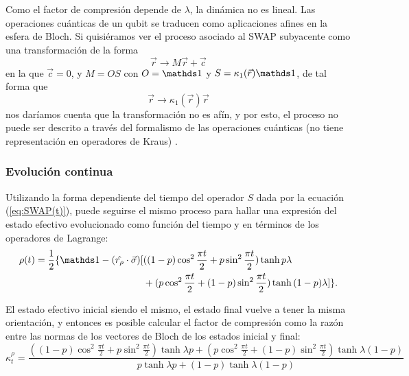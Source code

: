 Como el factor de compresión depende de $\lambda$, la dinámica no es lineal. Las operaciones cuánticas de un qubit se traducen como aplicaciones afines en la esfera de Bloch. Si quisiéramos ver el proceso asociado al \textsc{SWAP} subyacente como una transformación de la forma
\begin{equation*}
  \vec{r}\rightarrow M\vec{r}+\vec{c}
\end{equation*}
en la que $\vec{c}=0$, y $M=OS$ con $O=\Id$ y $S=\kappa_{1}(\vec{r})\Id$, de tal forma que
\begin{equation*}
  \vec{r}\rightarrow \kappa_{1}(\vec{r})\vec{r}
\end{equation*}
nos daríamos cuenta que la transformación no es afín, y por esto, el proceso no puede ser descrito a través del formalismo de las operaciones cuánticas (no tiene representación en operadores de Kraus) \cite{Chuang}.

\subsubsection{Evolución continua}

Utilizando la forma dependiente del tiempo del operador $S$ dada por la ecuación (\ref{eq:SWAP(t)}), puede seguirse el mismo proceso para hallar una expresión del estado efectivo evolucionado como función del tiempo y en términos de los operadores de Lagrange:
\begin{align}
  \begin{split}
  \rho(t)=\frac{1}{2}\{\Id-(\hat{r_{\rho}}\cdot\vec{\sigma})[&((1-p)\cos^{2}{\frac{\pi t}{2}}+p\sin^{2}{\frac{\pi t}{2}})\tanh{p\lambda}\\
  &+(p\cos^{2}{\frac{\pi t}{2}}+(1-p)\sin^{2}{\frac{\pi t}{2}})\tanh{(1-p)\lambda}]\}.
  \end{split}
\end{align}

El estado efectivo inicial siendo el mismo, el estado final vuelve a tener la misma orientación, y entonces es posible calcular el factor de compresión como la razón entre las normas de los vectores de Bloch de los estados inicial y final:
\begin{equation}\label{eq:SWAPFactort}
  \kappa_{t}^{\rho}=\frac{((1-p)\cos^{2}{\frac{\pi t}{2}}+p\sin^{2}{\frac{\pi t}{2}})\tanh{\lambda p}+(p\cos^{2}{\frac{\pi t}{2}}+(1-p)\sin^{2}{\frac{\pi t}{2}})\tanh{\lambda (1-p)}}{
    p\tanh{\lambda p}+(1-p)\tanh{\lambda (1-p)}}
\end{equation}

